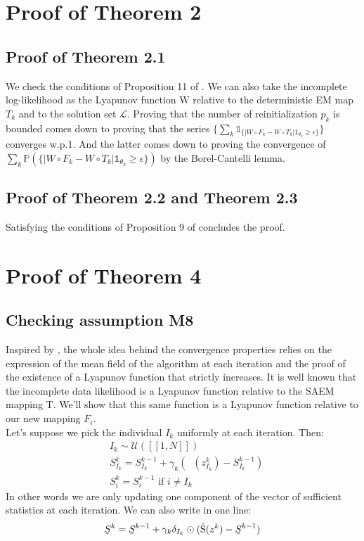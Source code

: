 \documentclass{article}
\theoremstyle{plain}
\DeclareMathOperator*{\St}{\tilde{S}}
\theoremstyle{plain}
\theoremstyle{definition}
\newcommand\barbelow[1]{\stackunder[1.2pt]{$#1$}{\rule{.8ex}{.075ex}}}
\begin{document}
\begin{appendices}
\section{Proof of Theorem 2}
\subsection{Proof of Theorem 2.1}
We check the conditions of Proposition 11 of \citep{fort}. We can also take the incomplete log-likelihood as the Lyapunov function W relative to the deterministic EM map $T_{k}$ and to the solution set $\mathcal{L}$. Proving that the number of reinitialization $p_k$ is bounded comes down to proving that the series $\{\sum_{k}{\mathbb{1}_{\{|W\circ F_{k} - W\circ T_{k}|\mathbb{1}_{\theta_{k}}\geq \epsilon\}}}\}$ converges w.p.1. And the latter comes down to proving the convergence of $\sum_{k}{\mathbb{P}({\{|W\circ F_{k} - W\circ T_{k}|\mathbb{1}_{\theta_{k}}\geq \epsilon\}})}$ by the Borel-Cantelli lemma.


\subsection{Proof of Theorem 2.2 and Theorem 2.3}
Satisfying the conditions of Proposition 9 of \citep{fort} concludes the proof.


\section{Proof of Theorem 4}
\subsection{Checking assumption M8}



Inspired by \citep{lavielle}, the whole idea behind the convergence properties relies on the expression of the mean field of the algorithm at each iteration and the proof of the existence of a Lyapunov function that strictly increases. It is well known that the incomplete data likelihood is a Lyapunov function relative to the SAEM mapping T. We'll show that this same function is a Lyapunov function relative to our new mapping $F_i$.\\
Let's suppose we pick the individual $I_k$ uniformly at each iteration. Then:
\begin{equation}
\begin{split}
& I_k \sim \mathcal{U}( [\![1,N]\!] )\\
& S_{I_k}^{k} = S_{I_k}^{k-1} + \gamma_k(\St(z_{I_k}^k)-S_{I_k}^{k-1})\\
& S_{i}^{k} = S_{i}^{k-1} \textrm{ if $i \neq I_k$}
\end{split}
\end{equation}
In other words we are only updating one component of the vector of sufficient statistics at each iteration. We can also write in one line:
\begin{equation}
\barbelow{S}^{k} = \barbelow{S}^{k-1} + \gamma_k \delta_{I_k}\odot(\St(z^k)-\barbelow{S}^{k-1})
\end{equation}


\end{appendices}
\end{document}

